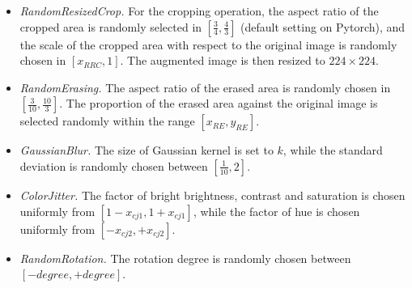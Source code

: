 \documentclass[letterpaper]{article} %
\begin{document}
\begin{itemize}
    \item \textit{RandomResizedCrop.} For the cropping operation, the aspect ratio of the cropped area is randomly selected in $\left[ \frac{3}{4}, \frac{4}{3} \right]$ (default setting on Pytorch), and the scale of the cropped area with respect to the original image is randomly chosen in $\left[ x_{RRC}, 1 \right]$. The augmented image is then resized to $224 \times 224$. 

    \item \textit{RandomErasing.} The aspect ratio of the erased area is randomly chosen in $\left[ \frac{3}{10}, \frac{10}{3} \right]$. The proportion of the erased area against the original image is selected randomly within the range $\left[ x_{RE}, y_{RE} \right]$. 

    \item \textit{GaussianBlur.} The size of Gaussian kernel is set to $k$, while the standard deviation is randomly chosen between $\left[ \frac{1}{10}, 2 \right]$.


    \item \textit{ColorJitter.}
    The factor of bright brightness, contrast and saturation is chosen uniformly from $\left[ 1-x_{cj1}, 1+x_{cj1} \right]$, while the factor of hue is chosen uniformly from $\left[ -x_{cj2}, +x_{cj2} \right]$. 

    \item \textit{RandomRotation.} The rotation degree is randomly chosen between $\left[ -degree, +degree \right]$.
\end{itemize}
\end{document}
